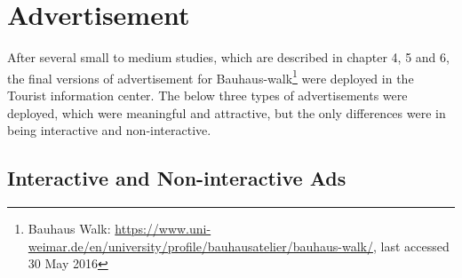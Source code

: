 \section{Advertisement}
After several small to medium studies, which are described in chapter 4, 5 and 6, the final versions of advertisement for Bauhaus-walk\footnote{Bauhaus Walk: \url{https://www.uni-weimar.de/en/university/profile/bauhausatelier/bauhaus-walk/}, last accessed 30 May 2016} were deployed in the Tourist information center. The below three types of advertisements were deployed, which were meaningful and attractive, but the only differences were in being interactive and non-interactive.




\subsection{Interactive and Non-interactive Ads}

